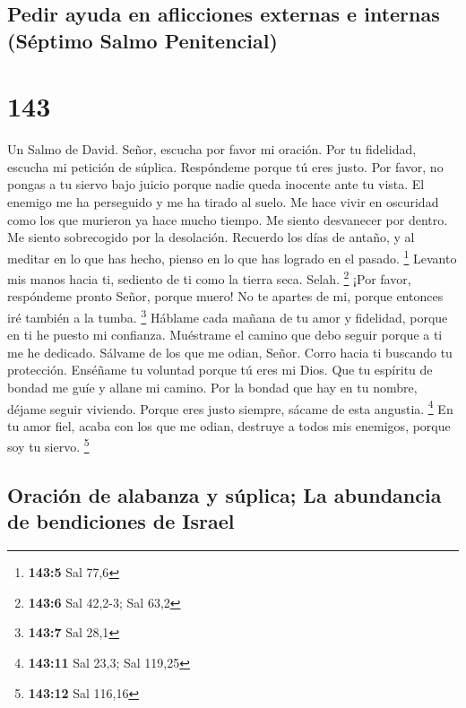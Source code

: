 \hypertarget{pedir-ayuda-en-aflicciones-externas-e-internas-suxe9ptimo-salmo-penitencial}{%
\subsection{Pedir ayuda en aflicciones externas e internas (Séptimo
Salmo
Penitencial)}\label{pedir-ayuda-en-aflicciones-externas-e-internas-suxe9ptimo-salmo-penitencial}}

\hypertarget{section-142}{%
\section{143}\label{section-142}}

Un Salmo de David.  Señor, escucha por favor mi oración. Por
tu fidelidad, escucha mi petición de súplica. Respóndeme porque tú eres
justo.  Por favor, no pongas a tu siervo bajo juicio porque
nadie queda inocente ante tu vista.  El enemigo me ha
perseguido y me ha tirado al suelo. Me hace vivir en oscuridad como los
que murieron ya hace mucho tiempo.  Me siento desvanecer por
dentro. Me siento sobrecogido por la desolación.  Recuerdo
los días de antaño, y al meditar en lo que has hecho, pienso en lo que
has logrado en el pasado. \footnote{\textbf{143:5} Sal 77,6}
 Levanto mis manos hacia ti, sediento de ti como la tierra
seca. Selah. \footnote{\textbf{143:6} Sal 42,2-3; Sal 63,2} 
¡Por favor, respóndeme pronto Señor, porque muero! No te apartes de mi,
porque entonces iré también a la tumba. \footnote{\textbf{143:7} Sal
  28,1}  Háblame cada mañana de tu amor y fidelidad, porque
en ti he puesto mi confianza. Muéstrame el camino que debo seguir porque
a ti me he dedicado.  Sálvame de los que me odian, Señor.
Corro hacia ti buscando tu protección.  Enséñame tu
voluntad porque tú eres mi Dios. Que tu espíritu de bondad me guíe y
allane mi camino.  Por la bondad que hay en tu nombre,
déjame seguir viviendo. Porque eres justo siempre, sácame de esta
angustia. \footnote{\textbf{143:11} Sal 23,3; Sal 119,25} 
En tu amor fiel, acaba con los que me odian, destruye a todos mis
enemigos, porque soy tu siervo. \footnote{\textbf{143:12} Sal 116,16}

\hypertarget{oraciuxf3n-de-alabanza-y-suxfaplica-la-abundancia-de-bendiciones-de-israel}{%
\subsection{Oración de alabanza y súplica; La abundancia de bendiciones
de
Israel}\label{oraciuxf3n-de-alabanza-y-suxfaplica-la-abundancia-de-bendiciones-de-israel}}

